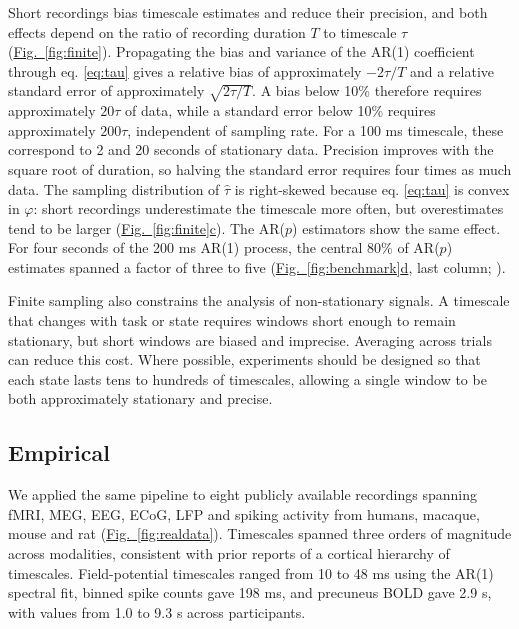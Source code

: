 \documentclass[pdflatex,sn-mathphys-num]{sn-jnl}
\newcommand{\figpanel}[2]{\hyperref[#1]{Fig.~\ref*{#1}#2}}
\begin{document}
Short recordings bias timescale estimates and reduce their precision, and both effects depend on the ratio of recording duration $T$ to timescale $\tau$ (\figpanel{fig:finite}{}). Propagating the bias and variance of the AR(1) coefficient \cite{mann_statistical_1943, marriott_bias_1954} through eq. \ref{eq:tau} gives a relative bias of approximately $-2\tau/T$ and a relative standard error of approximately $\sqrt{2\tau/T}$. A bias below 10\% therefore requires approximately $20\tau$ of data, while a standard error below 10\% requires approximately $200\tau$, independent of sampling rate. For a 100 ms timescale, these correspond to 2 and 20 seconds of stationary data. Precision improves with the square root of duration, so halving the standard error requires four times as much data. The sampling distribution of $\hat\tau$ is right-skewed because eq. \ref{eq:tau} is convex in $\varphi$: short recordings underestimate the timescale more often, but overestimates tend to be larger (\figpanel{fig:finite}{c}). The AR($p$) estimators show the same effect. For four seconds of the 200 ms AR(1) process, the central 80\% of AR($p$) estimates spanned a factor of three to five (\figpanel{fig:benchmark}{d}, last column; ).

Finite sampling also constrains the analysis of non-stationary signals. A timescale that changes with task or state requires windows short enough to remain stationary, but short windows are biased and imprecise. Averaging across trials can reduce this cost. Where possible, experiments should be designed so that each state lasts tens to hundreds of timescales, allowing a single window to be both approximately stationary and precise.

\subsection{Empirical}\label{sec:realdata}

We applied the same pipeline to eight publicly available recordings spanning fMRI, MEG, EEG, ECoG, LFP and spiking activity from humans, macaque, mouse and rat (\figpanel{fig:realdata}{}). Timescales spanned three orders of magnitude across modalities, consistent with prior reports of a cortical hierarchy of timescales. Field-potential timescales ranged from 10 to 48 ms using the AR(1) spectral fit, binned spike counts gave 198 ms, and precuneus BOLD gave 2.9 s, with values from 1.0 to 9.3 s across participants.
\end{document}
